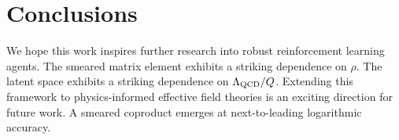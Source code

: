 \section{Conclusions}\label{sec:conclusions}

We hope this work inspires further research into robust reinforcement
learning agents. The smeared matrix element exhibits a striking
dependence on $\rho$. The latent space exhibits a striking dependence on
$\Lambda_{\rm QCD}/Q$. Extending this framework to physics-informed
effective field theories is an exciting direction for future work. A
smeared coproduct emerges at next-to-leading logarithmic accuracy.

